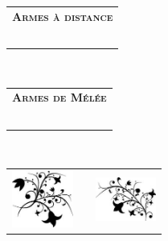 \documentclass[11pt,twoside,a4paper]{article}
\def\FRdefArmesADistance{Armes {\`a} distance}
\def\FRdefArmesDeMelee{Armes de M{\'e}l{\'e}e}
\begin{document}
\begin{multicols}{2}
	\begin{tabular}[c]{|p{9cm}|}
		\hline
		\textbf{\textsc{\FRdefArmesADistance}} \\ 
		\dotfill  [~~]	\\ 
		\dotfill  [~~]	\\ 
		\dotfill  [~~]	\\ 
		\dotfill  [~~]	\\ 
		\dotfill  [~~]	\\ 
		\hline
	\end{tabular}~\\
	
	\columnbreak %
	
	\begin{tabular}[c]{|p{8cm}|}
		\hline
		\textbf{\textsc{\FRdefArmesDeMelee}} \\ 
		\dotfill  [~~]	\\ 
		\dotfill  [~~]	\\ 
		\dotfill  [~~]	\\ 
		\dotfill  [~~]	\\ 
		\dotfill  [~~]	\\ 
		\hline
	\end{tabular}~\\

\end{multicols}

\begin{center}
	\begin{tabular}[c]{c p{8cm} c}
		\includegraphics[width=2cm]{../../../../../imgGraphics/artsDecos/flowersR2L.png} 
		&	&	
		\includegraphics[width=2cm]{../../../../../imgGraphics/artsDecos/flowersL2R.png}
	\end{tabular}
\end{center}
\end{document}
